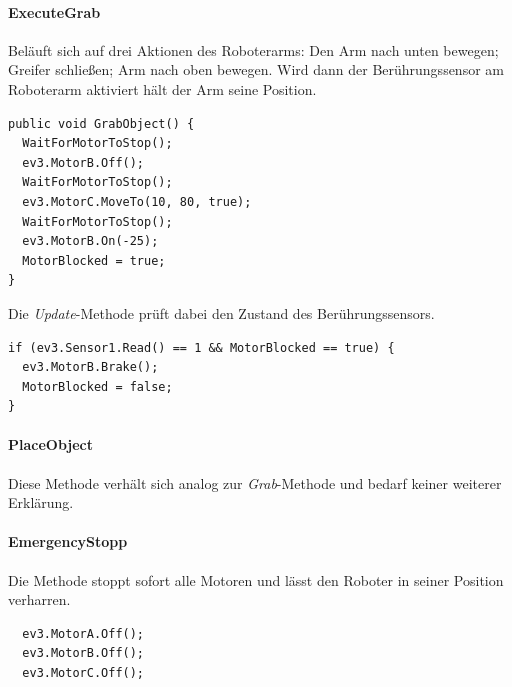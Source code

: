 \paragraph*{ExecuteGrab} Beläuft sich auf drei Aktionen des Roboterarms: Den Arm nach unten bewegen; Greifer schließen; Arm nach oben bewegen. Wird dann der Berührungssensor am Roboterarm aktiviert hält der Arm seine Position.

\begin{lstlisting}
public void GrabObject() { 
  WaitForMotorToStop();         
  ev3.MotorB.Off();         
  WaitForMotorToStop();         
  ev3.MotorC.MoveTo(10, 80, true);         
  WaitForMotorToStop();         
  ev3.MotorB.On(-25);         
  MotorBlocked = true;     
}
\end{lstlisting}

Die \textit{Update}-Methode prüft dabei den Zustand des Berührungssensors.

\begin{lstlisting}
if (ev3.Sensor1.Read() == 1 && MotorBlocked == true) { 
  ev3.MotorB.Brake();             
  MotorBlocked = false;
}
\end{lstlisting}

\paragraph*{PlaceObject} Diese Methode verhält sich analog zur \textit{Grab}-Methode und bedarf keiner weiterer Erklärung.

\paragraph*{EmergencyStopp} Die Methode stoppt sofort alle Motoren und lässt den Roboter in seiner Position verharren.

\begin{lstlisting}
  ev3.MotorA.Off();
  ev3.MotorB.Off();
  ev3.MotorC.Off(); 
\end{lstlisting}
